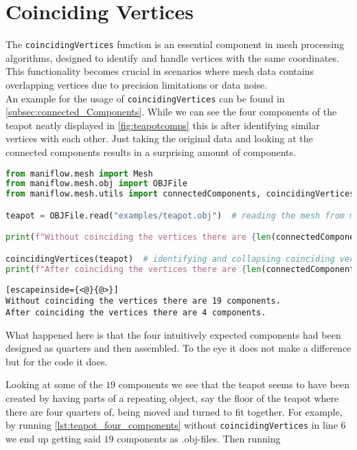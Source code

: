 \section{Coinciding Vertices}
The \texttt{coincidingVertices} function is an essential component in mesh processing algorithms, designed to identify and handle vertices with the same coordinates. This functionality becomes crucial in scenarios where mesh data contains overlapping vertices due to precision limitations or data noise.\\

An example for the usage of \texttt{coincidingVertices} can be found in \autoref{subsec:connected_Components}. While we can see the four components of the teapot neatly displayed in \autoref{fig:teapotcomps} this is after identifying similar vertices with each other. Just taking the original data and looking at the connected components results in a surprising amount of components.

\begin{lstlisting}[language=Python, caption={Connected components with and without \texttt{coincidingVertices}}, label={lst:coincidingVertices}]
from maniflow.mesh import Mesh
from maniflow.mesh.obj import OBJFile
from maniflow.mesh.utils import connectedComponents, coincidingVertices

teapot = OBJFile.read("examples/teapot.obj")  # reading the mesh from memory

print(f"Without coinciding the vertices there are {len(connectedComponents(teapot))} components.")

coincidingVertices(teapot)  # identifying and collapsing coinciding vertices
print(f"After coinciding the vertices there are {len(connectedComponents(teapot))} components.")
\end{lstlisting}

\begin{lstlisting}[escapeinside={<@}{@>}]
Without coinciding the vertices there are 19 components.
After coinciding the vertices there are 4 components.
\end{lstlisting}

What happened here is that the four intuitively expected components had been designed as quarters and then assembled. To the eye it does not make a difference but for the code it does.

Looking at some of the $19$ components we see that the teapot seems to have been created by having parts of a repeating object, say the floor of the teapot where there are four quarters of, being moved and turned to fit together. For example, by running \autoref{lst:teapot_four_components} without \texttt{coincidingVertices} in line 6 we end up getting said $19$ components as .obj-files. Then running

